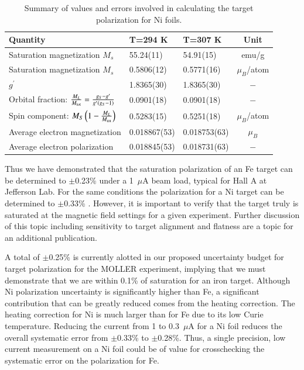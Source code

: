 \documentclass[preprint,12pt]{elsarticle}
\begin{document}
{\begin{table}[h]
\caption{\label{tab:final_errors_Ni}Summary of values and errors involved in calculating the target polarization for Ni foils.}
\begin{center}
\begin{tabular}{|l|l|l|c|}\hline
Quantity&T=294 K&T=307 K&Unit\\\hline
Saturation magnetization $M_s$ &55.24(11)&54.91(15)&emu/g\\
Saturation magnetization $M_s$&0.5806(12)&0.5771(16)&$\mu_B$/atom\\
$g^{\prime}$&1.8365(30)&1.8365(30)&$-$\\
Orbital fraction: $\frac{M_{L}}{M_{\rm tot}}=\frac{g_{S}-g^\prime}{g^\prime(g_{S}-1)}$&0.0901(18)&0.0901(18)&$-$\\
Spin component: $M_S\left(1-\frac{M_{L}}{M_{\rm tot}}\right)$&0.5283(15)&0.5251(18)&$\mu_B$/atom\\
Average electron magnetization&0.018867(53)&0.018753(63)&$\mu_B$\\
Average electron polarization&0.018845(53)&0.018731(63)&$-$\\\hline
\end{tabular}\end{center}
\end{table}

Thus we have demonstrated that the saturation polarization of an Fe target can be determined to $\pm$0.23\% under a 1~$\mu$A beam load, typical for Hall A at Jefferson Lab. For the same conditions the polarization for a Ni target can be determined to $\pm$0.33\% . However, it is important to verify that the target truly is saturated at the magnetic field settings for a given experiment. Further discussion of this topic including sensitivity to target alignment and flatness are a topic for an additional publication. 

A total of $\pm$0.25\% is currently alotted in our proposed uncertainty budget for target polarization for the MOLLER experiment, implying that we must demonstrate that we are within 0.1\% of saturation for an iron target.  Although Ni polarization uncertainty is significantly higher than Fe, a significant contribution that can be greatly reduced comes from the heating correction. The heating correction for Ni is much larger than for Fe due to its low Curie temperature. Reducing the current from 1 to 0.3~$\mu$A for a Ni foil reduces the overall systematic error from $\pm$0.33\% to $\pm$0.28\%. Thus, a single precision, low current measurement on a Ni foil could be of value for crosschecking the systematic error on the polarization for Fe. 


}
\end{document}
